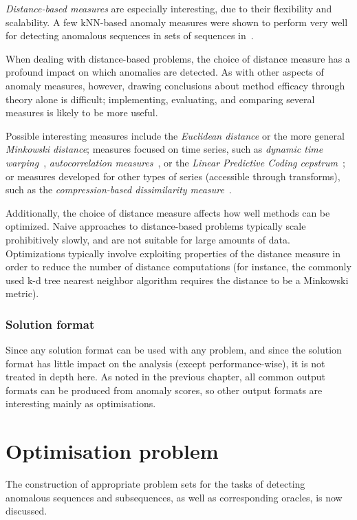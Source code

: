 \emph{Distance-based measures} are especially interesting, due to their flexibility and scalability. A few kNN-based anomaly measures were shown to perform very well for detecting anomalous sequences in sets of sequences in~\cite{chandola3}.

When dealing with distance-based problems, the choice of distance measure has a profound impact on which anomalies are detected. As with other aspects of anomaly measures, however, drawing conclusions about method efficacy through theory alone is difficult; implementing, evaluating, and comparing several measures is likely to be more useful.

Possible interesting measures include the \emph{Euclidean distance} or the more general \emph{Minkowski distance}; measures focused on time series, such as \emph{dynamic time warping}~\cite{dtw}, \emph{autocorrelation measures}~\cite{autocorrelation}, or the \emph{Linear Predictive Coding cepstrum}~\cite{cepstrum}; or measures developed for other types of series (accessible through transforms), such as the \emph{compression-based dissimilarity measure}~\cite{keogh2}.

Additionally, the choice of distance measure affects how well methods can be optimized. Naive approaches to distance-based problems typically scale prohibitively slowly, and are not suitable for large amounts of data. Optimizations typically involve exploiting properties of the distance measure in order to reduce the number of distance computations (for instance, the commonly used k-d tree nearest neighbor algorithm requires the distance to be a Minkowski metric).

\subsubsection{Solution format}

Since any solution format can be used with any problem, and since the solution format has little impact on the analysis (except performance-wise), it is not treated in depth here. As noted in the previous chapter, all common output formats can be produced from anomaly scores, so other output formats are interesting mainly as optimisations.

\section{Optimisation problem}

The construction of appropriate problem sets for the tasks of detecting anomalous sequences and subsequences, as well as corresponding oracles, is now discussed.

